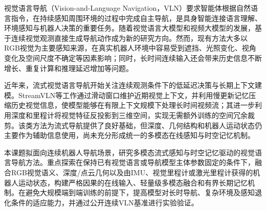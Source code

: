 
视觉语言导航（Vision-and-Language Navigation，VLN）要求智能体根据自然语言指令，在持续感知周围环境的过程中完成自主导航，是具身智能连接语言理解、环境感知与机器人决策的重要任务。随着视觉语言大模型和视频大模型的发展，基于连续视觉观测直接生成导航动作成为新的研究方向。然而，现有方法大多以RGB视觉为主要感知来源，在真实机器人环境中容易受到遮挡、光照变化、视角变化及空间尺度不确定等因素影响；同时，长时间连续输入还会带来历史信息不断增长、重复计算和推理延迟增加等问题。

近年来，流式视觉语言导航开始关注连续观测条件下的低延迟决策与长期上下文建模。StreamVLN等工作通过滑动窗口维护近期视觉上下文，并利用慢更新记忆压缩历史视觉信息，使模型能够在有限上下文规模下处理长时间视频流；其进一步利用深度和里程计将视觉特征反投影到三维空间，实现无需额外训练的空间冗余裁剪。该类方法为流式导航提供了良好基础，但深度、几何结构和机器人运动状态仍主要作为辅助信息使用，尚未充分形成统一的多模态在线感知与时空记忆机制。

本课题拟面向连续机器人导航场景，研究多模态流式感知与时空记忆驱动的视觉语言导航方法。重点探索在保持已有视觉语言或导航模型主体参数固定的条件下，融合RGB视觉语义、深度/点云几何以及由IMU、视觉里程计或激光里程计获得的机器人运动状态，构建严格因果的在线输入、轻量级多模态融合和有界长期记忆机制。在避免大规模端到端训练的前提下，提高模型对长时导航、复杂环境及感知退化条件的适应能力，并通过公开连续VLN基准进行实验验证。


